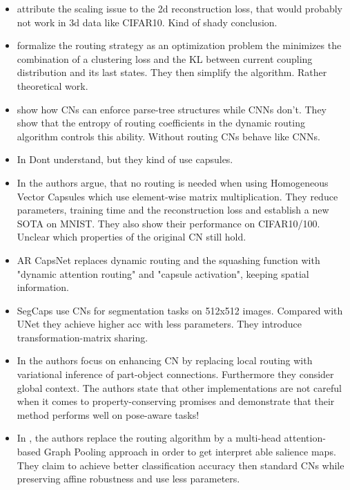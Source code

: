 \documentclass{article}
\begin{document}
\begin{itemize}
	\item \cite{corr/Xi2017} attribute the scaling issue to the 2d reconstruction loss, that would probably not work in 3d data like CIFAR10. Kind of shady conclusion.
	\item \cite{iclr/Wang018} formalize the routing strategy as an optimization problem the minimizes the combination of a clustering loss and the KL between current coupling distribution and its last states. They then simplify the algorithm. Rather theoretical work.
	\item \cite{corr/Anand2020} show how CNs can enforce parse-tree structures while CNNs don't. They show that the entropy of routing
	coefficients in the dynamic routing algorithm controls this ability. Without routing CNs behave like CNNs.
	\item In \cite{corr/Byerly2020} Dont understand, but they kind of use capsules.
	\item In \cite{ijon/ByerlyKD21} the authors argue, that no routing is needed when using  Homogeneous Vector Capsules which use element-wise matrix multiplication. They reduce parameters, training time and the reconstruction loss and establish a new SOTA on MNIST. They also show their performance on CIFAR10/100. Unclear which properties of the original CN still hold.
	\item AR CapsNet \cite{iccvw/ChoiSIK19} replaces dynamic routing and the squashing function with "dynamic attention routing" and "capsule activation", keeping spatial information.
	\item SegCaps \cite{corr/LaLonde2018} use CNs for segmentation tasks on 512x512 images. Compared with UNet they achieve higher acc with less parameters. They introduce transformation-matrix sharing.
	\item In \cite{nips/RibeiroLK20} the authors focus on enhancing CN by replacing local routing with variational inference of part-object connections. Furthermore they consider global context. The authors state that other implementations are not careful when it comes to property-conserving promises and demonstrate that their method performs well on pose-aware tasks!
	\item In \cite{aaai/Gu21}, the authors replace the routing algorithm by a multi-head attention-based Graph Pooling approach in order to get interpret able salience maps. They claim to achieve better classification accuracy then standard CNs while preserving affine robustness and use less parameters.
\end{itemize}
\end{document}
